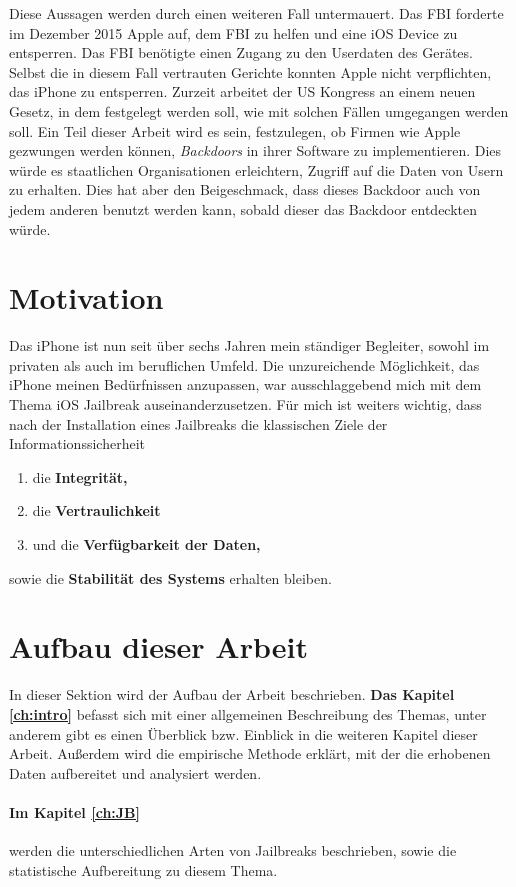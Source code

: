 Diese Aussagen werden durch einen weiteren Fall untermauert. Das FBI forderte im Dezember 2015 Apple auf, dem FBI zu helfen und eine iOS Device zu entsperren. Das FBI benötigte einen Zugang zu den Userdaten des Gerätes. Selbst die in diesem Fall vertrauten Gerichte konnten Apple nicht verpflichten, das iPhone zu entsperren. Zurzeit arbeitet der US Kongress an einem neuen Gesetz, in dem festgelegt werden soll, wie mit solchen Fällen umgegangen werden soll. Ein Teil dieser Arbeit wird es sein, festzulegen, ob Firmen wie Apple gezwungen werden können, \textit{\glqq Backdoors\grqq{}} in ihrer Software zu implementieren. Dies würde es staatlichen Organisationen erleichtern, Zugriff auf die Daten von Usern zu erhalten. Dies hat aber den Beigeschmack, dass dieses Backdoor auch von jedem anderen benutzt werden kann, sobald dieser das Backdoor entdeckten würde. 

\section{Motivation }
\label{sec:IntroMotivation}
Das iPhone ist nun seit über sechs Jahren mein ständiger Begleiter, sowohl im privaten als auch im beruflichen Umfeld. Die unzureichende Möglichkeit, das iPhone meinen Bedürfnissen anzupassen, war ausschlaggebend mich mit dem Thema iOS Jailbreak auseinanderzusetzen. 
Für mich ist weiters wichtig, dass nach der Installation eines Jailbreaks die klassischen Ziele der Informationssicherheit
\begin{enumerate}
    \item die \textbf{Integrität,}
    \item die \textbf{Vertraulichkeit} 
    \item und die \textbf{Verfügbarkeit der Daten,}
\end{enumerate}
sowie die \textbf{Stabilität des Systems} erhalten bleiben.


\section{Aufbau dieser Arbeit}
\label{sec:IntroAufbau}
In dieser Sektion wird der Aufbau der Arbeit beschrieben. \textbf{Das Kapitel \ref{ch:intro}} befasst sich mit einer allgemeinen Beschreibung des Themas, unter anderem gibt es einen Überblick bzw. Einblick in die weiteren Kapitel dieser Arbeit. Außerdem wird die empirische Methode erklärt, mit der die erhobenen Daten aufbereitet und analysiert werden. 

\paragraph{Im Kapitel \ref{ch:JB}} werden die unterschiedlichen Arten von Jailbreaks beschrieben, sowie die statistische Aufbereitung zu diesem Thema.

